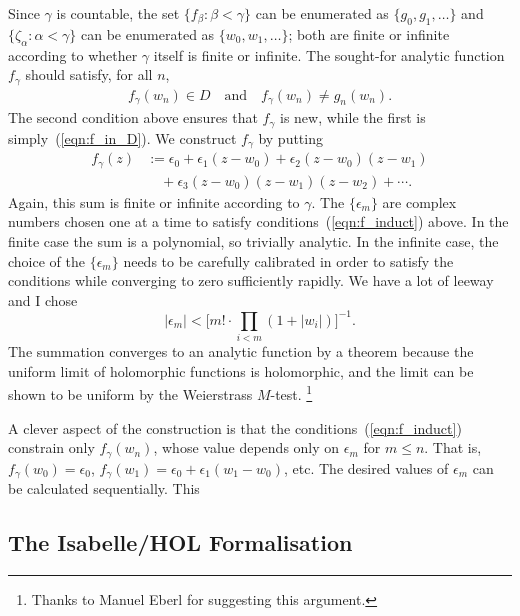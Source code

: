 \documentclass[runningheads]{llncs}
\begin{document}
Since $\gamma$ is countable, the set $\{f_\beta: \beta<\gamma\}$ can be enumerated as $\{g_0, g_1, \ldots\}$
and $\{\zeta_\alpha : \alpha < \gamma\}$ can be enumerated as $\{w_0, w_1, \ldots\}$;
both are finite or infinite according to whether $\gamma$ itself is finite or infinite.
The sought-for analytic function $f_\gamma$ should satisfy, for all $n$,
\begin{align}
	f_\gamma (w_n) \in D \quad\text{and}\quad f_\gamma (w_n) \not= g_n(w_n). \label{eqn:f_induct}
\end{align}
%
The second condition above ensures that $f_\gamma$ is new, while the first is simply~(\ref{eqn:f_in_D}).
We construct $f_\gamma$ by putting
\begin{align*}
f_\gamma(z) & := \epsilon_0 + \epsilon_1 (z - w_0) + \epsilon_2 (z - w_0)(z - w_1)\\
	       & \quad + \epsilon_3 (z - w_0)(z - w_1)(z - w_2) + \cdots.	
\end{align*}
Again, this sum is finite or infinite according to $\gamma$. 
The $\{\epsilon_m\}$ are complex numbers chosen one at a time to satisfy conditions~(\ref{eqn:f_induct}) above. 
In the finite case the sum is a polynomial, so trivially analytic. 
In the infinite case, the choice of the $\{\epsilon_m\}$ needs to be carefully calibrated in order to satisfy the conditions while converging to zero sufficiently rapidly. 
We have a lot of leeway and I chose $$|\epsilon_m| < \bigl[m! \cdot \prod_{i<m} (1 + |w_i|)\bigr]^{-1}. $$
The summation converges to an analytic function by a theorem because the uniform limit of holomorphic functions is holomorphic, and the limit can be shown to be uniform by the Weierstrass $M$-test.%
\footnote{Thanks to Manuel Eberl for suggesting this argument.}

A clever aspect of the construction is that the conditions~(\ref{eqn:f_induct}) constrain only $f_\gamma(w_n)$, 
whose value depends only on $\epsilon_m$ for $m\le n$. That is, $f_\gamma(w_0) = \epsilon_0$, $f_\gamma(w_1) = \epsilon_0 + \epsilon_1 (w_1 - w_0)$, etc.
The desired values of $\epsilon_m$ can be calculated sequentially.
This
\subsection{The Isabelle/HOL Formalisation}
\end{document}
